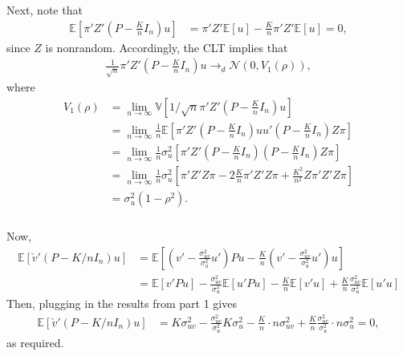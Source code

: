\documentclass[12pt]{article}
\newcommand{\E}{\mathbb{E}}
\newcommand{\V}{\mathbb{V}}
\newcommand{\mtx}[1]{\ensuremath{\bm{\mathit{#1}}}}
\newcommand{\N}{\mathcal{N}}
\begin{document}
\subsubsection{}
Next, note that
\begin{align*}
\E[\mtx{\pi}'\mtx{Z}'(\mtx{P} - \frac{K}{n}\mtx{I}_n)\mtx{u}] &= \mtx{\pi}'\mtx{Z}'\E[\mtx{u}] - \frac{K}{n}\mtx{\pi}'\mtx{Z}'\E[\mtx{u}] = 0,
\end{align*}
since $\mtx{Z}$ is nonrandom. Accordingly, the CLT implies that
\begin{align*}
\frac{1}{\sqrt{n}} \mtx{\pi}'\mtx{Z}'(\mtx{P} - \frac{K}{n}\mtx{I}_n)\mtx{u} \to_d \N(0, V_1(\rho)),
\end{align*}
where
\begin{align*}
V_1(\rho) &= \lim_{n\to \infty} \V[1/\sqrt{n}\mtx{\pi}'\mtx{Z}'(\mtx{P} - \frac{K}{n}\mtx{I}_n)\mtx{u}]\\
&=\lim_{n\to \infty} \frac{1}{n}\E[\mtx{\pi}'\mtx{Z}'(\mtx{P} - \frac{K}{n}\mtx{I}_n)\mtx{u}\mtx{u}' (\mtx{P} - \frac{K}{n}\mtx{I}_n)\mtx{Z}\mtx{\pi}]\\
&=\lim_{n\to \infty} \frac{1}{n} \sigma^2_u \left[ \mtx{\pi}'\mtx{Z}'(\mtx{P} - \frac{K}{n}\mtx{I}_n)(\mtx{P} - \frac{K}{n}\mtx{I}_n)\mtx{Z}\mtx{\pi}\right]\\
&=\lim_{n\to \infty} \frac{1}{n} \sigma^2_u \left[ \mtx{\pi}'\mtx{Z}'\mtx{Z}\mtx{\pi}- 2\frac{K}{n}\mtx{\pi}'\mtx{Z}'\mtx{Z}\mtx{\pi} + \frac{K^2}{n^2}\mtx{Z}\mtx{\pi}'\mtx{Z}'\mtx{Z}\mtx{\pi}\right]\\
&= \sigma^2_u (1-\rho^2).
\end{align*}

\subsubsection{}
Now,
\begin{align*}
\E[ \check{\mtx{v}}'(\mtx{P} -K/n\mtx{I}_n) \mtx{u}] &= \E\left[\left({\mtx{v}}' - \frac{\sigma^2_{uv}}{\sigma^2_u}\mtx{u}'\right)\mtx{P}\mtx{u} - \frac{K}{n} \left({\mtx{v}}' - \frac{\sigma^2_{uv}}{\sigma^2_u}\mtx{u}'\right)\mtx{u}\right]\\
&=\E[{\mtx{v}}'\mtx{P}\mtx{u}] - \frac{\sigma^2_{uv}}{\sigma^2_u}\E[\mtx{u}'\mtx{P}\mtx{u}] - \frac{K}{n}\E[\mtx{v}'\mtx{u}] + \frac{K}{n}\frac{\sigma^2_{uv}}{\sigma^2_u}\E[\mtx{u}'\mtx{u}]
\end{align*}
Then, plugging in the results from part 1 gives
\begin{align*}
\E[ \check{\mtx{v}}'(\mtx{P} -K/n\mtx{I}_n) \mtx{u}] &= K\sigma^2_{uv} - \frac{\sigma^2_{uv}}{\sigma^2_u} K \sigma^2_u - \frac{K}{n} \cdot n \sigma^2_{uv} + \frac{K}{n}\frac{\sigma^2_{uv}}{\sigma^2_u} \cdot n \sigma^2_u = 0,
\end{align*}
as required. \\
\end{document}
